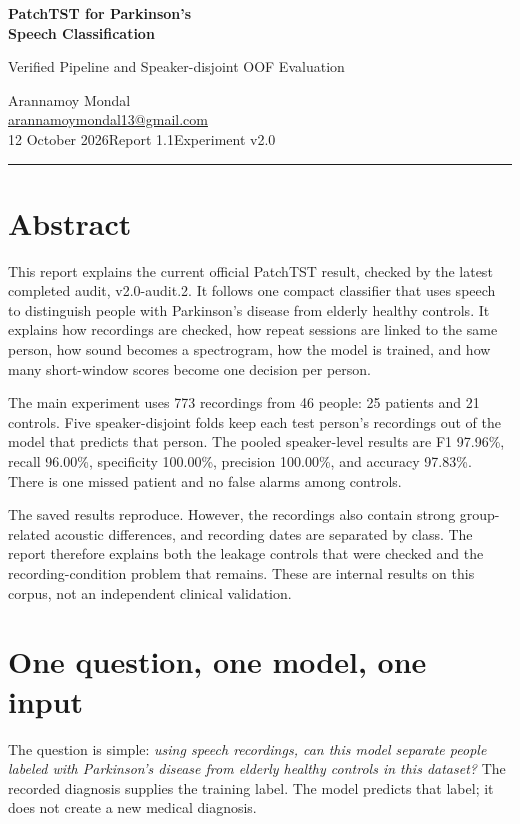 \documentclass[11pt,a4paper]{article}
\begin{document}
\begin{center}
{\LARGE\bfseries PatchTST for Parkinson's\\[3pt] Speech Classification\par}
\vspace{8pt}
{\large Verified Pipeline and Speaker-disjoint OOF Evaluation\par}
\vspace{10pt}
Arannamoy Mondal\\
\href{mailto:arannamoymondal13@gmail.com}{arannamoymondal13@gmail.com}\\[5pt]
12 October 2026\quad\textbullet\quad Report 1.1\quad\textbullet\quad Experiment v2.0
\end{center}
\vspace{3pt}\hrule\vspace{8pt}

\section*{Abstract}
This report explains the current official PatchTST result, checked by the latest
completed audit, v2.0-audit.2. It follows one compact classifier
that uses speech to distinguish people with Parkinson's disease from elderly
healthy controls. It explains how recordings are checked, how repeat sessions
are linked to the same person, how sound becomes a spectrogram, how the model is
trained, and how many short-window scores become one decision per person.

The main experiment uses 773 recordings from 46 people: 25 patients and 21
controls. Five speaker-disjoint folds keep each test person's recordings out of
the model that predicts that person. The pooled speaker-level results are F1
97.96\%, recall 96.00\%, specificity 100.00\%, precision 100.00\%, and accuracy
97.83\%. There is one missed patient and no false alarms among controls.

The saved results reproduce. However, the recordings also contain strong
group-related acoustic differences, and recording dates are separated by class.
The report therefore explains both the leakage controls that were checked and
the recording-condition problem that remains. These are internal results on
this corpus, not an independent clinical validation.

\section{One question, one model, one input}
The question is simple: \emph{using speech recordings, can this model separate
people labeled with Parkinson's disease from elderly healthy controls in this
dataset?} The recorded diagnosis supplies the training label. The model predicts
that label; it does not create a new medical diagnosis.
\end{document}
